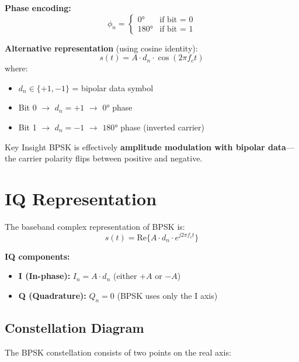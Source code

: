 \textbf{Phase encoding:}
\begin{equation}
\phi_n = \begin{cases}
0° & \text{if bit = 0} \\
180° & \text{if bit = 1}
\end{cases}
\end{equation}

\textbf{Alternative representation} (using cosine identity):
\begin{equation}
s(t) = A \cdot d_n \cdot \cos(2\pi f_c t)
\end{equation}
where:
\begin{itemize}
\item $d_n \in \{+1, -1\}$ = bipolar data symbol
\item Bit 0 $\rightarrow$ $d_n = +1$ $\rightarrow$ $0°$ phase
\item Bit 1 $\rightarrow$ $d_n = -1$ $\rightarrow$ $180°$ phase (inverted carrier)
\end{itemize}

\begin{calloutbox}{Key Insight}
BPSK is effectively \textbf{amplitude modulation with bipolar data}---the carrier polarity flips between positive and negative.
\end{calloutbox}

\section{IQ Representation}

The baseband complex representation of BPSK is:
\begin{equation}
s(t) = \mathrm{Re}\{A \cdot d_n \cdot e^{j2\pi f_c t}\}
\end{equation}

\textbf{IQ components:}
\begin{itemize}
\item \textbf{I (In-phase):} $I_n = A \cdot d_n$ (either $+A$ or $-A$)
\item \textbf{Q (Quadrature):} $Q_n = 0$ (BPSK uses only the I axis)
\end{itemize}

\subsection{Constellation Diagram}

The BPSK constellation consists of two points on the real axis:

